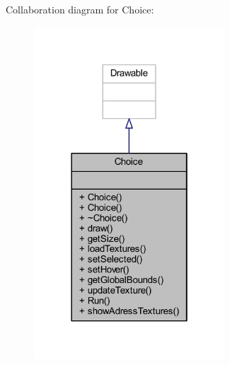 Collaboration diagram for Choice\+:
\nopagebreak
\begin{figure}[H]
\begin{center}
\leavevmode
\includegraphics[width=202pt]{class_choice__coll__graph}
\end{center}
\end{figure}
